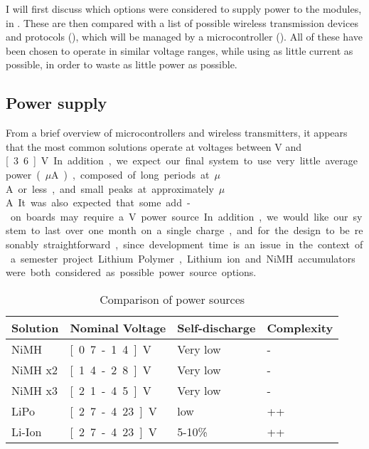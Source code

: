 I will first discuss which options were considered to supply power to the
modules, in . These are then compared with a list of
possible wireless transmission devices and protocols (), which
will be managed by a microcontroller (). All of these
have been chosen to operate in similar voltage ranges, while using as little
current as possible, in order to waste as little power as possible.

\subsection{Power supply}
\label{sub:power-supply}

From a brief overview of microcontrollers and wireless transmitters, it appears
that the most common solutions operate at voltages between \unit[2]{V} and
\unit[3.6]{V}. In addition, we expect our final system to use very little
average power (\unit[1-10]{$\mu$A}), composed of long periods at
\unit[1]{$\mu$A} or less, and small peaks at approximately \unit[50]{$\mu$A}. It
was also expected that some add-on boards may require a \unit[5]{V} power
source.

In addition, we would like our system to last over one month on a single charge, 
and for the design to be resonably straightforward, since development time is an
issue in the context of a semester project.

Lithium Polymer, Lithium ion and NiMH accumulators were both considered as
possible power source options. 

\begin{table}
  \centering
  \begin{tabular}{l|l|l|l}
    Solution	& Nominal Voltage	& Self-discharge	& Complexity \\
    \hline
    NiMH 	& \unit[0.7-1.4]{V}	& Very low		& -	     \\
    NiMH x2 	& \unit[1.4-2.8]{V}	& Very low		& -	     \\
    NiMH x3 	& \unit[2.1-4.5]{V}	& Very low		& -	     \\
    LiPo 	& \unit[2.7-4.23]{V}	& low			& ++	     \\
    Li-Ion 	& \unit[2.7-4.23]{V}	& 5-10\%		& ++	     \\
  \end{tabular}
  \caption{Comparison of power sources}
  \label{tab:battery-comparison}
\end{table}

